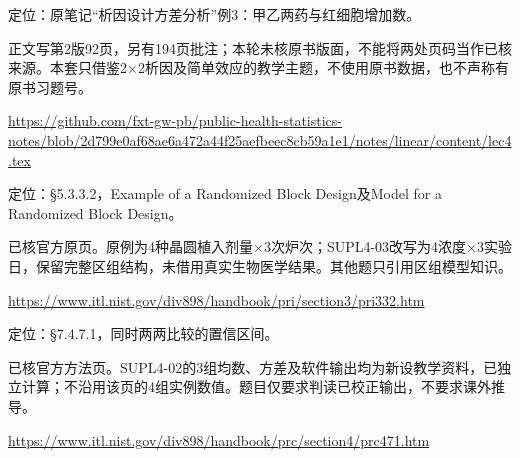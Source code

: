 \par\noindent\begin{minipage}{\linewidth}\label{src:NI_REPO}
\par
定位：原笔记“析因设计方差分析”例3：甲乙两药与红细胞增加数。\par
正文写第2版92页，另有194页批注；本轮未核原书版面，不能将两处页码当作已核来源。本套只借鉴2×2析因及简单效应的教学主题，不使用原书数据，也不声称有原书习题号。\par
{\small\url{https://github.com/fxt-gw-pb/public-health-statistics-notes/blob/2d799e0af68ae6a472a44f25aefbeec8cb59a1e1/notes/linear/content/lec4.tex}}\par
\end{minipage}\par\medskip

\par\noindent\begin{minipage}{\linewidth}\label{src:NIST_BLOCK}
\par
定位：§5.3.3.2，Example of a Randomized Block Design及Model for a Randomized Block Design。\par
已核官方原页。原例为4种晶圆植入剂量×3次炉次；SUPL4-03改写为4浓度×3实验日，保留完整区组结构，未借用真实生物医学结果。其他题只引用区组模型知识。\par
{\small\url{https://www.itl.nist.gov/div898/handbook/pri/section3/pri332.htm}}\par
\end{minipage}\par\medskip

\par\noindent\begin{minipage}{\linewidth}\label{src:NIST_TUKEY}
\par
定位：§7.4.7.1，同时两两比较的置信区间。\par
已核官方方法页。SUPL4-02的3组均数、方差及软件输出均为新设教学资料，已独立计算；不沿用该页的4组实例数值。题目仅要求判读已校正输出，不要求课外推导。\par
{\small\url{https://www.itl.nist.gov/div898/handbook/prc/section4/prc471.htm}}\par
\end{minipage}\par\medskip

